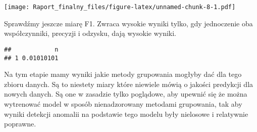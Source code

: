 \documentclass[
]{article}
\newenvironment{Shaded}{\begin{snugshade}}{\end{snugshade}}
\newcommand{\DataTypeTok}[1]{\textcolor[rgb]{0.13,0.29,0.53}{#1}}
\newcommand{\DecValTok}[1]{\textcolor[rgb]{0.00,0.00,0.81}{#1}}
\newcommand{\KeywordTok}[1]{\textcolor[rgb]{0.13,0.29,0.53}{\textbf{#1}}}
\newcommand{\NormalTok}[1]{#1}
\newcommand{\OperatorTok}[1]{\textcolor[rgb]{0.81,0.36,0.00}{\textbf{#1}}}
\newcommand{\StringTok}[1]{\textcolor[rgb]{0.31,0.60,0.02}{#1}}
\begin{document}
\texttt{[image: Raport\_finalny\_files/figure-latex/unnamed-chunk-8-1.pdf]}

Sprawdźmy jeszcze miarę F1. Zwraca wysokie wyniki tylko, gdy jednoczenie
oba współczynniki, precyzji i odzysku, dają wysokie wyniki.

\begin{Shaded}
\end{Shaded}

\begin{verbatim}
##            n
## 1 0.01010101
\end{verbatim}

Na tym etapie mamy wyniki jakie metody grupowania mogłyby dać dla tego
zbioru danych. Są to niestety miary które niewiele mówią o jakości
predykcji dla nowych danych. Są one w zasadzie tylko poglądowe, aby
upewnić się że można wytrenować model w sposób nienadzorowany metodami
grupowania, tak aby wyniki detekcji anomalii na podstawie tego modelu
były nielosowe i relatywnie poprawne.
\end{document}
